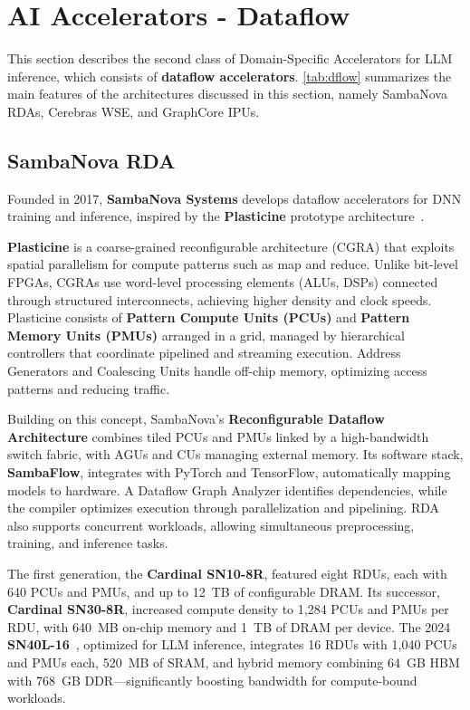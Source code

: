 \section{AI Accelerators - Dataflow}\label{chap:background:sec:dflow}

This section describes the second class of Domain-Specific Accelerators for LLM inference, which consists of \textbf{dataflow accelerators}. \ref{tab:dflow} summarizes the main features of the architectures discussed in this section, namely SambaNova RDAs, Cerebras WSE, and GraphCore IPUs.

\subsection{SambaNova RDA}
\label{chap:background:sec:sambanova}

Founded in 2017, \textbf{SambaNova Systems} develops dataflow accelerators for DNN training and inference, inspired by the \textbf{Plasticine} prototype architecture~\cite{Prabhakar2017}.

\textbf{Plasticine} is a coarse-grained reconfigurable architecture (CGRA) that exploits spatial parallelism for compute patterns such as map and reduce. Unlike bit-level FPGAs, CGRAs use word-level processing elements (ALUs, DSPs) connected through structured interconnects, achieving higher density and clock speeds. Plasticine consists of \textbf{Pattern Compute Units (PCUs)} and \textbf{Pattern Memory Units (PMUs)} arranged in a grid, managed by hierarchical controllers that coordinate pipelined and streaming execution. Address Generators and Coalescing Units handle off-chip memory, optimizing access patterns and reducing traffic.

Building on this concept, SambaNova’s \textbf{Reconfigurable Dataflow Architecture} \cite{sambanova} combines tiled PCUs and PMUs linked by a high-bandwidth switch fabric, with AGUs and CUs managing external memory. Its software stack, \textbf{SambaFlow}, integrates with PyTorch and TensorFlow, automatically mapping models to hardware. A Dataflow Graph Analyzer identifies dependencies, while the compiler optimizes execution through parallelization and pipelining. RDA also supports concurrent workloads, allowing simultaneous preprocessing, training, and inference tasks.

The first generation, the \textbf{Cardinal SN10-8R}, featured eight RDUs, each with 640 PCUs and PMUs, and up to 12~TB of configurable DRAM. Its successor, \textbf{Cardinal SN30-8R}, increased compute density to 1,284 PCUs and PMUs per RDU, with 640~MB on-chip memory and 1~TB of DRAM per device. The 2024 \textbf{SN40L-16}~\cite{Prabhakar2024}, optimized for LLM inference, integrates 16 RDUs with 1,040 PCUs and PMUs each, 520~MB of SRAM, and hybrid memory combining 64~GB HBM with 768~GB DDR—significantly boosting bandwidth for compute-bound workloads.


